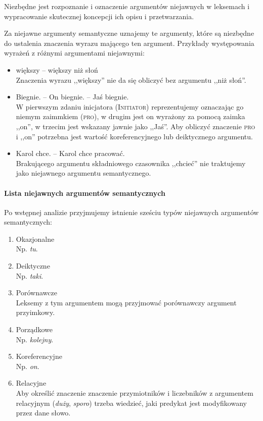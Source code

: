 \documentclass[12pt]{mwart}
\theoremstyle{remark}
\begin{document}
Niezbędne jest rozpoznanie i oznaczenie argumentów niejawnych w leksemach i wypracowanie skutecznej koncepcji ich opisu i przetwarzania.

Za niejawne argumenty semantyczne uznajemy te argumenty, które są niezbędne do ustalenia znaczenia wyrazu mającego ten argument.
Przykłady występowania wyrażeń z różnymi argumentami niejawnymi:
\begin{itemize}
	\item większy -- większy niż słoń \\ Znaczenia wyrazu ,,większy'' nie da się obliczyć bez argumentu ,,niż słoń''.
	\item Biegnie. -- On biegnie. -- Jaś biegnie. \\
	W pierwszym zdaniu inicjatora (\textsc{Initiator}) reprezentujemy oznaczając go niemym zaimmkiem (\textsc{pro}), w drugim jest on wyrażony za pomocą zaimka ,,on'', w trzecim jest wskazany jawnie jako ,,Jaś''.
	Aby obliczyć znaczenie \textsc{pro} i ,,on'' potrzebna jest wartość koreferencyjnego lub deiktycznego argumentu.
	\item Karol chce. -- Karol chce pracować.\\
	Brakującego argumentu składniowego czasownika ,,chcieć'' nie traktujemy jako niejawnego argumentu semantycznego.
\end{itemize}

\paragraph{Lista niejawnych argumentów semantycznych} %
\label{niejawne}
Po wstępnej analizie przyjmujemy istnienie sześciu typów niejawnych argumentów semantycznych:

\begin{enumerate}
\item Okazjonalne \\ Np. \emph{tu}.
\item Deiktyczne\\ Np. \emph{taki}.
\item Porównawcze \\ Leksemy z tym argumentem mogą przyjmować porównawczy argument przyimkowy.
\item Porządkowe \\ Np. \emph{kolejny}.
\item Koreferencyjne \\ Np. \emph{on}.
\item Relacyjne \\ Aby określić znaczenie znaczenie przymiotników i liczebników z argumentem relacyjnym (\emph{duży}, \emph{sporo}) trzeba wiedzieć, jaki predykat jest modyfikowany przez dane słowo.
\label{relac}
\end{enumerate}
\end{document}
